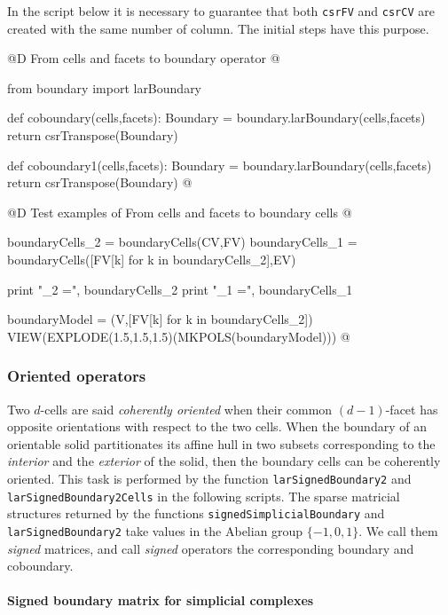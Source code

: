\documentclass[11pt,oneside]{article}    %
\begin{document}
In the script below it is necessary to guarantee that both \texttt{csrFV} and \texttt{csrCV} are created with the same number of column. The initial steps have this purpose.

@D From cells and facets to boundary operator
@{from boundary import larBoundary

def coboundary(cells,facets):
    Boundary = boundary.larBoundary(cells,facets)
    return csrTranspose(Boundary)

def coboundary1(cells,facets):
    Boundary = boundary.larBoundary(cells,facets)
    return csrTranspose(Boundary)
@}
@D Test examples of From cells and facets to boundary cells
@{boundaryCells_2 = boundaryCells(CV,FV)
boundaryCells_1 = boundaryCells([FV[k] for k in boundaryCells_2],EV)

print "\nboundaryCells_2 =\n", boundaryCells_2
print "\nboundaryCells_1 =\n", boundaryCells_1

boundaryModel = (V,[FV[k] for k in boundaryCells_2])
VIEW(EXPLODE(1.5,1.5,1.5)(MKPOLS(boundaryModel)))
@}



\subsubsection{Oriented operators}

Two $d$-cells are said \emph{coherently oriented} when their common $(d-1)$-facet has opposite orientations with respect to the two cells. When the boundary of an orientable solid partitionates its affine hull in two subsets corresponding to the \emph{interior} and the \emph{exterior} of the solid, then the boundary cells can be coherently oriented. This task is performed by the function \texttt{larSignedBoundary2} and \texttt{larSignedBoundary2Cells} in the following scripts.
The sparse matricial structures returned by the functions \texttt{signedSimplicialBoundary} and \texttt{larSignedBoundary2} take values in the Abelian group $\{-1,0,1\}$. We call them \emph{signed} matrices, and call \emph{signed} operators the corresponding boundary and coboundary.


\paragraph{Signed boundary matrix for simplicial complexes}
\end{document}
